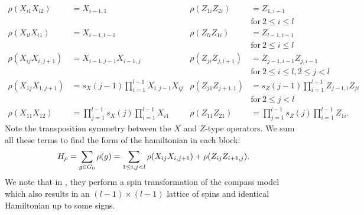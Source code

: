 \begin{align*}
\rho(X_{i1} X_{i2}) &= X_{i-1,1} &
\rho(Z_{1i} Z_{2i}) &= Z_{1,i-1} \\&&&\mbox{for}\ 2\le i\le l\\
\rho(X_{il} X_{i1}) &= X_{i-1,l-1} &
\rho(Z_{li} Z_{1i}) &= Z_{l-1,i-1} \\&&&\mbox{for}\ 2\le i\le l\\
\rho(X_{ij} X_{i,j+1}) &= X_{i-1,j-1} X_{i-1,j} &
\rho(Z_{ji} Z_{j,i+1}) &= Z_{j-1,i-1}Z_{j,i-1} \\&&&\mbox{for}\ 2\le i\le l, 2\le j<l\\
\rho(X_{1j} X_{1,j+1}) &= s_X(j-1) \prod_{i=1}^{l-1} X_{i,j-1} X_{ij} &
\rho(Z_{j1} Z_{j+1,1}) &= s_Z(j-1) \prod_{i=1}^{l-1} Z_{j-1,i} Z_{ji} \\&&&\mbox{for}\ 2\le j<l\\
\rho(X_{11} X_{12}) &= \prod_{j=1}^{l-1}s_X(j) \prod_{i=1}^{l-1} X_{i1} &
\rho(Z_{11} Z_{21}) &= \prod_{j=1}^{l-1}s_Z(j) \prod_{i=1}^{l-1} Z_{1i}.
\end{align*}
Note the transposition symmetry between the $X$ and $Z$-type operators.
We sum all these terms to find 
the form of the hamiltonian in each block:
$$
H_\rho = \sum_{g\in G_0} \rho(g) = \sum_{1\le i,j<l} \rho(X_{ij}X_{i,j+1}) + \rho(Z_{ij}Z_{i+1,j}).
$$
We note that in \cite{Brzezicki2013},
they perform a
spin transformation of the compass model
which also results in an $(l-1)\times(l-1)$ lattice
of spins and identical Hamiltonian up to some signs.


%
%
%
%

